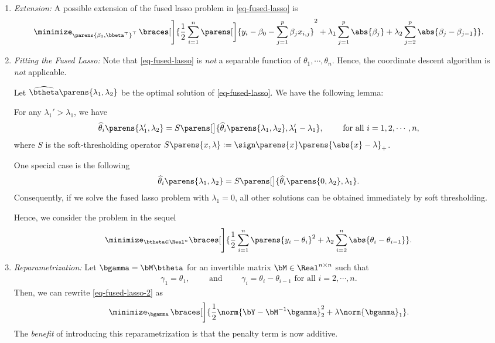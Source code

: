 \documentclass[12pt]{article}
\begin{document}
\begin{enumerate}[label=\textbf{\arabic*.}]
\begin{enumerate}
		\item \textit{Extension:} A possible extension of the fused lasso problem in \eqref{eq-fused-lasso} is 
		\begin{align*}
			\minimize_{\parens{\beta_0, \bbeta^\top}^\top} \, \braces[\Bigg]{\frac{1}{2} \sum_{i=1}^n \parens[\bigg]{y_i - \beta_0 - \sum_{j=1}^p \beta_j x_{i,j}}^2 + \lambda_1 \sum_{j=1}^p \abs{\beta_j} + \lambda_2 \sum_{j=2}^p \abs{\beta_j - \beta_{j-1}} }. 
		\end{align*}
		\item \textit{Fitting the Fused Lasso:} Note that \eqref{eq-fused-lasso} is \emph{not} a separable function of $\theta_1, \cdots, \theta_n$. Hence, the coordinate descent algorithm is \emph{not} applicable. 
		
		Let $\widehat{\btheta} \parens{\lambda_1, \lambda_2}$ be the optimal solution of \eqref{eq-fused-lasso}. We have the following lemma: 
		
		\begin{lemma}
			For any $\lambda_1' > \lambda_1$, we have 
			\begin{align*}
				\widehat{\theta}_i \parens{\lambda_1', \lambda_2} = S \parens[\big]{\widehat{\theta}_i \parens{\lambda_1, \lambda_2}, \lambda_1' - \lambda_1}, \qquad \text{ for all } i = 1, 2, \cdots, n, 
			\end{align*}
			where $S$ is the soft-thresholding operator $S \parens{x, \lambda} := \sign \parens{x} \parens{\abs{x} - \lambda}_+$. 
		\end{lemma}
		One special case is the following 
		\begin{align*}
			\widehat{\theta}_i \parens{\lambda_1, \lambda_2} = S \parens[\big]{\widehat{\theta}_i \parens{0, \lambda_2}, \lambda_1}. 
		\end{align*}
		Consequently, if we solve the fused lasso problem with $\lambda_1 = 0$, all other solutions can be obtained immediately by soft thresholding. 
		
		Hence, we consider the problem in the sequel 
		\begin{align}\label{eq-fused-lasso-2}
			\minimize_{\btheta \in \Real^n} \braces[\Bigg]{\frac{1}{2} \sum_{i=1}^n \parens{y_i - \theta_i}^2 + \lambda_2 \sum_{i=2}^n \abs{\theta_{i} - \theta_{i-1}}}. 
		\end{align}
		
		\item \textit{Reparametrization:} Let $\bgamma = \bM \btheta$ for an invertible matrix $\bM \in \Real^{n \times n}$ such that 
		\begin{align*}
			\gamma_1 = \theta_1, \qquad \text{ and } \qquad \gamma_i = \theta_i - \theta_{i-1} \text{ for all } i = 2, \cdots, n. 
		\end{align*}
		Then, we can rewrite \eqref{eq-fused-lasso-2} as 
		\begin{align}\label{eq-fused-lasso-3}
			\minimize_{\bgamma} \, \braces[\bigg]{\frac{1}{2} \norm{\bY - \bM^{-1} \bgamma}_2^2 + \lambda \norm{\bgamma}_1}. 
		\end{align}
		The \textit{benefit} of introducing this reparametrization is that the penalty term is now additive. 
		

\end{enumerate}
\end{enumerate}
\end{document}
